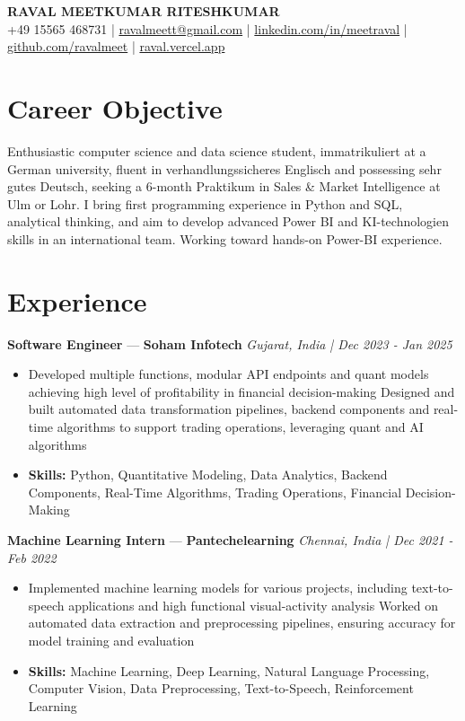 \documentclass[a4paper,10pt]{article}
\begin{document}
\begin{center}
  {\Large\bfseries RAVAL MEETKUMAR RITESHKUMAR}\\[2pt]
  {\small +49 15565 468731 \;|\; \href{mailto:ravalmeett@gmail.com}{ravalmeett@gmail.com} \;|\; \href{https://www.linkedin.com/in/meetraval/}{linkedin.com/in/meetraval} \;|\; \href{https://github.com/ravalmeet}{github.com/ravalmeet} \;|\; \href{https://raval.vercel.app/}{raval.vercel.app}}
\end{center}
\vspace{-3pt}

\section*{Career Objective}
Enthusiastic computer science and data science student, immatrikuliert at a German university, fluent in verhandlungssicheres Englisch and possessing sehr gutes Deutsch, seeking a 6-month Praktikum in Sales \& Market Intelligence at Ulm or Lohr. I bring first programming experience in Python and SQL, analytical thinking, and aim to develop advanced Power BI and KI-technologien skills in an international team. Working toward hands-on Power-BI experience.\par

\section*{Experience}
\textbf{Software Engineer} — \textbf{Soham Infotech} \hfill \textit{Gujarat, India \;|\; Dec 2023 - Jan 2025}\par
\vspace{1pt}
\begin{itemize}
  \item Developed multiple functions, modular API endpoints and quant models achieving high level of profitability in financial decision-making Designed and built automated data transformation pipelines, backend components and real-time algorithms to support trading operations, leveraging quant and AI algorithms
  \item \textbf{Skills:} Python, Quantitative Modeling, Data Analytics, Backend Components, Real-Time Algorithms, Trading Operations, Financial Decision-Making
\end{itemize}
\vspace{3pt}
\textbf{Machine Learning Intern} — \textbf{Pantechelearning} \hfill \textit{Chennai, India \;|\; Dec 2021 - Feb 2022}\par
\vspace{1pt}
\begin{itemize}
  \item Implemented machine learning models for various projects, including text-to-speech applications and high functional visual-activity analysis Worked on automated data extraction and preprocessing pipelines, ensuring accuracy for model training and evaluation
  \item \textbf{Skills:} Machine Learning, Deep Learning, Natural Language Processing, Computer Vision, Data Preprocessing, Text-to-Speech, Reinforcement Learning
\end{itemize}
\end{document}
